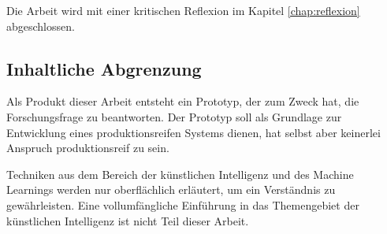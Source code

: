 Die Arbeit wird mit einer kritischen Reflexion im Kapitel \ref{chap:reflexion} abgeschlossen.

\subsection{Inhaltliche Abgrenzung}

Als Produkt dieser Arbeit entsteht ein Prototyp, der zum Zweck hat, die Forschungsfrage zu beantworten. Der Prototyp soll als Grundlage zur Entwicklung eines produktionsreifen Systems dienen, hat selbst aber keinerlei Anspruch produktionsreif zu sein.

Techniken aus dem Bereich der künstlichen Intelligenz und des Machine Learnings werden nur oberflächlich erläutert, um ein Verständnis zu gewährleisten. Eine vollumfängliche Einführung in das Themengebiet der künstlichen Intelligenz ist nicht Teil dieser Arbeit.
